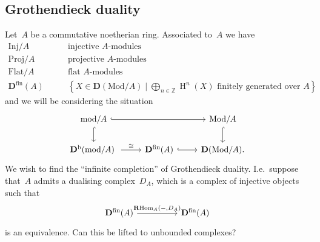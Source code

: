 \documentclass[10pt,a4paper]{article}
\theoremstyle{lecture}
\newcommand\bounded{\ensuremath{\mathrm{b}}}
\newcommand\derived{\ensuremath{\mathbf{D}}}
\newcommand\fin{\ensuremath{\mathrm{fin}}}
\newcommand\Flat{\ensuremath{\mathrm{Flat}}}
\newcommand\Inj{\ensuremath{\mathrm{Inj}}}
\newcommand\Mod{\ensuremath{\mathrm{Mod}}}
\DeclareMathOperator\HH{H}
\DeclareMathOperator\RRRHom{\mathbf{R}Hom}
\begin{document}
\subsection{Grothendieck duality}
Let~$A$ be a commutative noetherian ring. Associated to~$A$ we have
\begin{equation}
  \begin{aligned}
    \Inj/A & \qquad\text{injective $A$-modules} \\
    \mathrm{Proj}/A & \qquad\text{projective $A$-modules} \\
    \Flat/A & \qquad\text{flat $A$-modules} \\
    \derived^\fin(A) & \qquad\left\{ X\in\derived(\Mod/A)\mid\bigoplus_{n\in\mathbb{Z}}\HH^n(X)\text{ finitely generated over $A$} \right\}
  \end{aligned}
\end{equation}
and we will be considering the situation
\begin{equation}
  \begin{tikzcd}
    \mathrm{mod}/A \arrow[hook]{d} \arrow[hook]{rr} & & \Mod/A \arrow[hook]{d} \\
    \derived^\bounded(\mathrm{mod}/A) \arrow{r}{\cong} & \derived^\fin(A) \arrow[hook]{r} & \derived(\Mod/A).
  \end{tikzcd}
\end{equation}
We wish to find the ``infinite completion'' of Grothendieck duality. I.e.\ suppose that~$A$ admits a dualising complex~$D_A$, which is a complex of injective objects such that
\begin{equation}
  \begin{tikzcd}[column sep = huge]
    \derived^\fin(A) \arrow{r}{\RRRHom_A(-,D_A)} & \derived^\fin(A)
  \end{tikzcd}
\end{equation}
is an equivalence. Can this be lifted to unbounded complexes?
\end{document}
